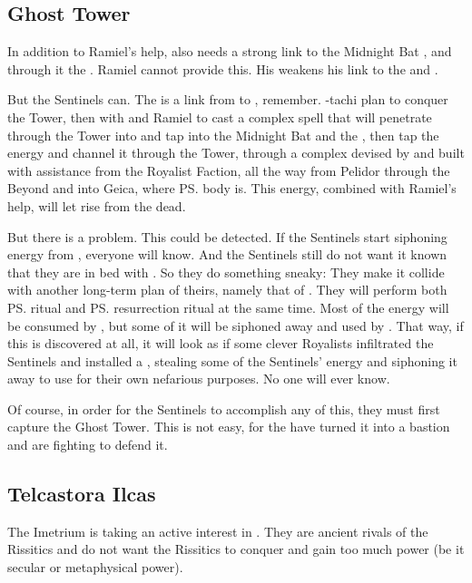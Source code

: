 \begin{garbage}
\subsection{Ghost Tower}
In addition to Ramiel's help, \Shiaraid{} also needs a strong link to the Midnight Bat \matrix, and through it the \Erebean{} \dweomer. 
Ramiel cannot provide this. 
His \kenosis{} weakens his link to the \matrix{} and \dweomer. 

But the Sentinels can. 
The  is a link from \Azmith{} to \Nyx, remember. 
\Secherdamon-tachi plan to conquer the Tower, then \cooperate{} with \Shiaraid{} and Ramiel to cast a complex spell that will penetrate through the Tower into \Nyx{} and tap into the Midnight Bat and the \dweomer, then tap the energy and channel it through the Tower, through a complex  devised by \Vizsherioch{} and built with assistance from the Royalist Faction, all the way from Pelidor through the Beyond and into Geica, where \ps{\Belzir} body is. 
This energy, combined with Ramiel's help, will let \Shiaraid{} rise from the dead. 

But there is a problem. 
This could be detected. 
If the Sentinels start siphoning energy from \Nyx, everyone will know. 
And the Sentinels still do not want it known that they are in bed with \Shiaraid. 
So they do something sneaky: 
They make it collide with another long-term plan of theirs, namely that of . 
They will perform both \ps{\Vizsherioch} \shaeeroth{} ritual and \ps{\Shiaraid} resurrection ritual at the same time. 
Most of the energy will be consumed by \Vizsherioch, but some of it will be siphoned away and used by \Shiaraid. 
That way, if this is discovered at all, it will look as if some clever Royalists infiltrated the Sentinels and installed a , stealing some of the Sentinels' energy and siphoning it away to use for their own nefarious purposes. 
No one will ever know. 

Of course, in order for the Sentinels to accomplish any of this, they must first capture the Ghost Tower. 
This is not easy, for the \resphain{} have turned it into a bastion and are fighting to defend it. 






\subsection{Telcastora Ilcas}
The Imetrium is taking an active interest in \Velcad. 
They are ancient rivals of the Rissitics and do not want the Rissitics to conquer and gain too much power (be it secular or metaphysical power). 


\end{garbage}
